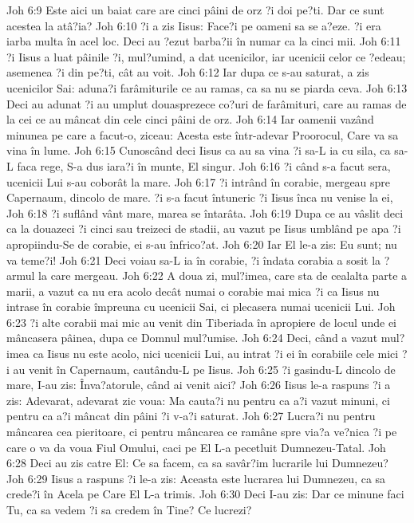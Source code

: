 Joh 6:9  Este aici un baiat care are cinci pâini de orz ?i doi pe?ti. Dar ce sunt acestea la atâ?ia?
Joh 6:10  ?i a zis Iisus: Face?i pe oameni sa se a?eze. ?i era iarba multa în acel loc. Deci au ?ezut barba?ii în numar ca la cinci mii.
Joh 6:11  ?i Iisus a luat pâinile ?i, mul?umind, a dat ucenicilor, iar ucenicii celor ce ?edeau; asemenea ?i din pe?ti, cât au voit.
Joh 6:12  Iar dupa ce s-au saturat, a zis ucenicilor Sai: aduna?i farâmiturile ce au ramas, ca sa nu se piarda ceva.
Joh 6:13  Deci au adunat ?i au umplut douasprezece co?uri de farâmituri, care au ramas de la cei ce au mâncat din cele cinci pâini de orz.
Joh 6:14  Iar oamenii vazând minunea pe care a facut-o, ziceau: Acesta este într-adevar Proorocul, Care va sa vina în lume.
Joh 6:15  Cunoscând deci Iisus ca au sa vina ?i sa-L ia cu sila, ca sa-L faca rege, S-a dus iara?i în munte, El singur.
Joh 6:16  ?i când s-a facut sera, ucenicii Lui s-au coborât la mare.
Joh 6:17  ?i intrând în corabie, mergeau spre Capernaum, dincolo de mare. ?i s-a facut întuneric ?i Iisus înca nu venise la ei,
Joh 6:18  ?i suflând vânt mare, marea se întarâta.
Joh 6:19  Dupa ce au vâslit deci ca la douazeci ?i cinci sau treizeci de stadii, au vazut pe Iisus umblând pe apa ?i apropiindu-Se de corabie, ei s-au înfrico?at.
Joh 6:20  Iar El le-a zis: Eu sunt; nu va teme?i!
Joh 6:21  Deci voiau sa-L ia în corabie, ?i îndata corabia a sosit la ?armul la care mergeau.
Joh 6:22  A doua zi, mul?imea, care sta de cealalta parte a marii, a vazut ca nu era acolo decât numai o corabie mai mica ?i ca Iisus nu intrase în corabie împreuna cu ucenicii Sai, ci plecasera numai ucenicii Lui.
Joh 6:23  ?i alte corabii mai mic au venit din Tiberiada în apropiere de locul unde ei mâncasera pâinea, dupa ce Domnul mul?umise.
Joh 6:24  Deci, când a vazut mul?imea ca Iisus nu este acolo, nici ucenicii Lui, au intrat ?i ei în corabiile cele mici ?i au venit în Capernaum, cautându-L pe Iisus.
Joh 6:25  ?i gasindu-L dincolo de mare, I-au zis: Înva?atorule, când ai venit aici?
Joh 6:26  Iisus le-a raspuns ?i a zis: Adevarat, adevarat zic voua: Ma cauta?i nu pentru ca a?i vazut minuni, ci pentru ca a?i mâncat din pâini ?i v-a?i saturat.
Joh 6:27  Lucra?i nu pentru mâncarea cea pieritoare, ci pentru mâncarea ce ramâne spre via?a ve?nica ?i pe care o va da voua Fiul Omului, caci pe El L-a pecetluit Dumnezeu-Tatal.
Joh 6:28  Deci au zis catre El: Ce sa facem, ca sa savâr?im lucrarile lui Dumnezeu?
Joh 6:29  Iisus a raspuns ?i le-a zis: Aceasta este lucrarea lui Dumnezeu, ca sa crede?i în Acela pe Care El L-a trimis.
Joh 6:30  Deci I-au zis: Dar ce minune faci Tu, ca sa vedem ?i sa credem în Tine? Ce lucrezi?
